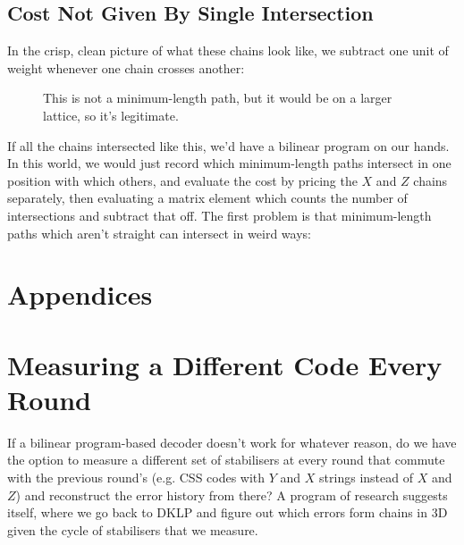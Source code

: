 \documentclass[a4paper, english]{scrartcl}
\begin{document}
\subsection{Cost Not Given By Single Intersection}
In the crisp, clean picture of what these chains look like, we subtract one unit of weight whenever one chain crosses another:
\begin{figure}
[!h]
\centering
{}
\caption{This is not a minimum-length path, but it would be on a larger lattice, so it's legitimate.}
\end{figure}

If all the chains intersected like this, we'd have a bilinear program on our hands. 
In this world, we would just record which minimum-length paths intersect in one position with which others, and evaluate the cost by pricing the $X$ and $Z$ chains separately, then evaluating a matrix element which counts the number of intersections and subtract that off. 
The first problem is that minimum-length paths which aren't straight can intersect in weird ways:


\section*{Appendices}
\appendix
\section{Measuring a Different Code Every Round}
If a bilinear program-based decoder doesn't work for whatever reason, do we have the option to measure a different set of stabilisers at every round that commute with the previous round's (e.g. CSS codes with $Y$ and $X$ strings instead of $X$ and $Z$) and reconstruct the error history from there?
A program of research suggests itself, where we go back to DKLP and figure out which errors form chains in 3D given the cycle of stabilisers that we measure. 
\end{document}
